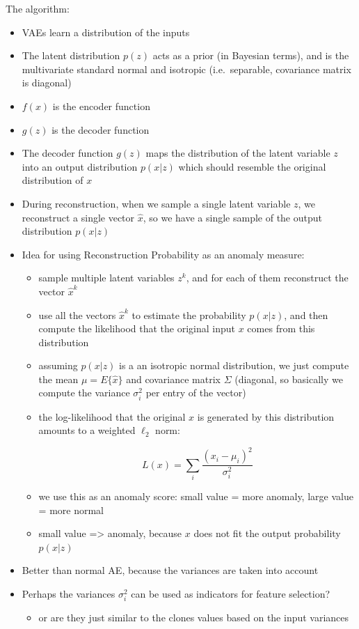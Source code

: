 \documentclass[
  letterpaper,
  DIV=11,
  numbers=noendperiod]{scrartcl}
\providecommand{\tightlist}{%
  \setlength{\itemsep}{0pt}\setlength{\parskip}{0pt}}\usepackage{longtable,booktabs,array}
\begin{document}
The algorithm:

\begin{itemize}
\item
  VAEs learn a distribution of the inputs
\item
  The latent distribution \(p(z)\) acts as a prior (in Bayesian terms),
  and is the multivariate standard normal and isotropic (i.e.~separable,
  covariance matrix is diagonal)
\item
  \(f(x)\) is the encoder function
\item
  \(g(z)\) is the decoder function
\item
  The decoder function \(g(z)\) maps the distribution of the latent
  variable \(z\) into an output distribution \(p(x|z)\) which should
  resemble the original distribution of \(x\)
\item
  During reconstruction, when we sample a single latent variable \(z\),
  we reconstruct a single vector \(\hat{x}\), so we have a single sample
  of the output distribution \(p(x|z)\)
\item
  Idea for using Reconstruction Probability as an anomaly measure:

  \begin{itemize}
  \item
    sample multiple latent variables \(z^k\), and for each of them
    reconstruct the vector \(\hat{x}^k\)
  \item
    use all the vectors \(\hat{x}^k\) to estimate the probability
    \(p(x|z)\), and then compute the likelihood that the original input
    \(x\) comes from this distribution
  \item
    assuming \(p(x|z)\) is a an isotropic normal distribution, we just
    compute the mean \(\mu = E \lbrace \hat{x} \rbrace\) and covariance
    matrix \(\Sigma\) (diagonal, so basically we compute the variance
    \(\sigma_i^2\) per entry of the vector)
  \item
    the log-likelihood that the original \(x\) is generated by this
    distribution amounts to a weighted \(\ell_2\) norm:

    \[L(x) = \sum_i \frac{(x_i - \mu_i)^2}{\sigma_i^2}\]
  \item
    we use this as an anomaly score: small value = more anomaly, large
    value = more normal
  \item
    small value =\textgreater{} anomaly, because \(x\) does not fit the
    output probability \(p(x|z)\)
  \end{itemize}
\item
  Better than normal AE, because the variances are taken into account
\item
  Perhaps the variances \(\sigma_i^2\) can be used as indicators for
  feature selection?

  \begin{itemize}
  \tightlist
  \item
    or are they just similar to the clones values based on the input
    variances
  \end{itemize}
\end{itemize}
\end{document}
